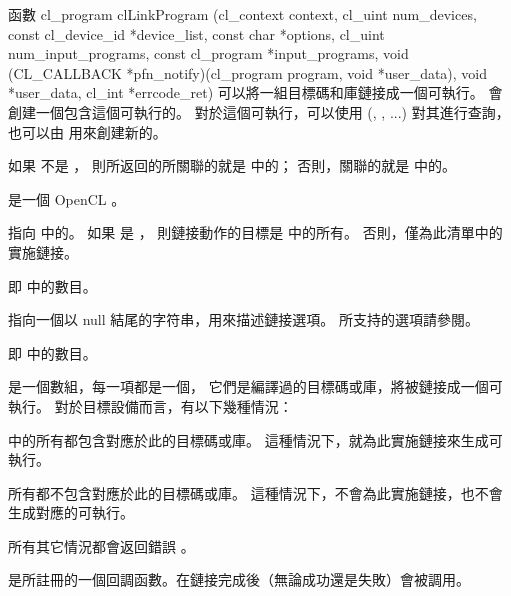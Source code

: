 函數
\startclc
cl_program clLinkProgram (cl_context context,
			cl_uint num_devices,
			const cl_device_id *device_list,
			const char *options,
			cl_uint num_input_programs,
			const cl_program *input_programs,
			void (CL_CALLBACK *pfn_notify)(cl_program program,
						void *user_data),
			void *user_data,
cl_int *errcode_ret)
\stopclc
可以將一組目標碼和庫鏈接成一個可執行。
  會創建一個包含這個可執行的。
對於這個可執行，可以使用 (,
 , ...) 對其進行查詢，
也可以由  用來創建新的。

如果  不是 ，
則所返回的所關聯的就是  中的；
否則，關聯的就是  中的。

 是一個 OpenCL 。

 指向  中的。
如果  是 ，
則鏈接動作的目標是  中的所有。
否則，僅為此清單中的實施鏈接。

 即  中的數目。

 指向一個以 null 結尾的字符串，用來描述鏈接選項。
所支持的選項請參閱。

 即  中的數目。

 是一個數組，每一項都是一個，
它們是編譯過的目標碼或庫，將被鏈接成一個可執行。
對於目標設備而言，有以下幾種情況：
\startigBase
\item {} 中的所有都包含對應於此的目標碼或庫。
這種情況下，就為此實施鏈接來生成可執行。

\item 所有都不包含對應於此的目標碼或庫。
這種情況下，不會為此實施鏈接，也不會生成對應的可執行。

\item 所有其它情況都會返回錯誤 。
\stopigBase

 是所註冊的一個回調函數。在鏈接完成後（無論成功還是失敗）會被調用。

